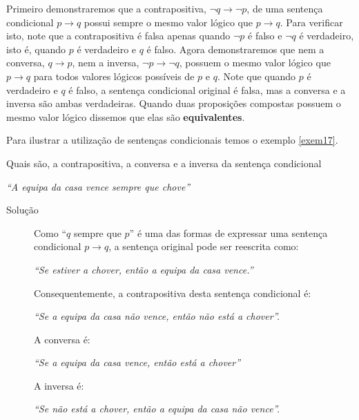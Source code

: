 Primeiro demonstraremos que a contrapositiva, $\lnot q \to \lnot p$, de uma
sentença condicional $p \to q$ possui sempre o mesmo valor lógico que $p \to
q$. Para verificar isto, note que a contrapositiva é falsa apenas quando $\lnot
p$ é falso e $\lnot q$ é verdadeiro, isto é, quando $p$ é verdadeiro e $q$ é
falso. Agora demonstraremos que nem a conversa, $q \to p$, nem a inversa,
$\lnot p \to \lnot q$, possuem o mesmo valor lógico que $p \to q$ para todos
valores lógicos possíveis de $p$ e $q$. Note que quando $p$ é verdadeiro e $q$ é
falso, a sentença condicional original é falsa, mas a conversa e a inversa são
ambas verdadeiras. Quando duas proposições compostas possuem o mesmo valor
lógico dissemos que elas são \textbf{equivalentes}.

Para ilustrar a utilização de sentenças condicionais temos o exemplo
\ref{exem17}.


\begin{exmp}
\label{exem17}
Quais são, a contrapositiva, a conversa e a inversa da sentença condicional
\begin{center}\emph{``A equipa da casa vence sempre que chove''}\end{center}
\end{exmp}

\begin{description}
	\item[Solução] Como ``$q$ sempre que $p$'' é uma das formas de expressar uma
	sentença condicional $p \to q$, a sentença original pode ser reescrita como:
	
	\begin{center}\emph{``Se estiver a chover, então a equipa da casa
	vence.''}\end{center}
	
	Consequentemente, a contrapositiva desta sentença condicional é:
	
	\begin{center}\emph{``Se a equipa da casa não vence, então não está a
	chover''.}\end{center}
	
	A conversa é:
	
	\begin{center}\emph{``Se a equipa da casa vence, então está a
	chover''}\end{center}
	
	A inversa é:
	
	\begin{center}\emph{``Se não está a chover, então a equipa da casa não
	vence''.}\end{center}
\end{description}

